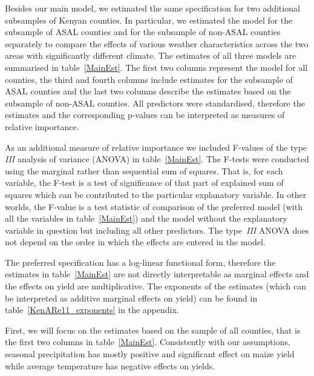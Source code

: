 \documentclass[12pt]{iopart}
\begin{document}
Besides our main model, we estimated the same specification for two additional subsamples of Kenyan counties. In particular, we estimated the model for the subsample of ASAL counties and for the subsample of non-ASAL counties separately to compare the effects of various weather characteristics across the two areas with significantly different climate. The estimates of all three models are summarised in table~\ref{MainEst}. The first two columns represent the model for all counties, the third and fourth columns include estimates for the subsample of ASAL counties and the last two columns describe the estimates based on the subsample of non-ASAL counties. All predictors were standardised, therefore the estimates and the corresponding p-values can be interpreted as measures of relative importance. 

As an additional measure of relative importance we included F-values of the type \textit{III} analysis of variance (ANOVA) in table~\ref{MainEst}. The F-tests were conducted using the marginal rather than sequential sum of squares. That is, for each variable, the F-test is a test of significance of that part of explained sum of squares which can be contributed to the particular explanatory variable. In other worlds, the F-value is a test statistic of comparison of the preferred model (with all the variables in table~\ref{MainEst}) and the model without the explanatory variable in question but including all other predictors. The type~\textit{III} ANOVA does not depend on the order in which the effects are entered in the model.

The preferred specification has a log-linear functional form, therefore the estimates in table~\ref{MainEst} are not directly interpretable as marginal effects and the effects on yield are multiplicative. The exponents of the estimates (which can be interpreted as additive marginal effects on yield) can be found in table~\ref{KenARe11_exponents} in the appendix.


First, we will focus on the estimates based on the sample of all counties, that is the first two columns in table~\ref{MainEst}. Consistently with our assumptions, seasonal precipitation has mostly positive and significant effect on maize yield while average temperature has negative effects on yields.  
\end{document}
